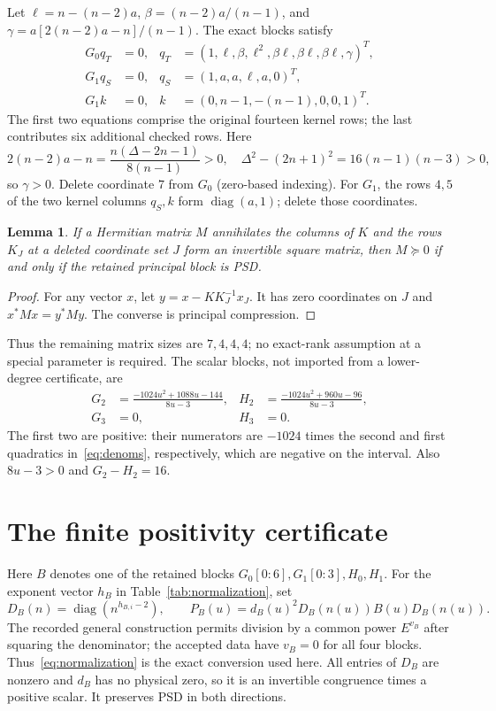 \documentclass[11pt]{article}
\newtheorem{lemma}[theorem]{Lemma}
\DeclareMathOperator{\diag}{diag}
\begin{document}
Let $\ell=n-(n-2)a$, $\beta=(n-2)a/(n-1)$, and
$\gamma=a[2(n-2)a-n]/(n-1)$. The exact blocks satisfy
\begin{align}
 G_0q_T&=0,& q_T&=(1,\ell,\beta,\ell^2,\beta\ell,\beta\ell,\beta\ell,\gamma)^T,
 \label{eq:kernelT}\\
 G_1q_S&=0,& q_S&=(1,a,a,\ell,a,0)^T,\nonumber\\
 G_1k&=0,& k&=(0,n-1,-(n-1),0,0,1)^T.\label{eq:kernelS}
\end{align}
The first two equations comprise the original fourteen kernel rows;
the last contributes six additional checked rows. Here
\[
 2(n-2)a-n=\frac{n(\Delta-2n-1)}{8(n-1)}>0,
 \quad \Delta^2-(2n+1)^2=16(n-1)(n-3)>0,
\]
so $\gamma>0$. Delete coordinate $7$ from $G_0$ (zero-based indexing).
For $G_1$, the rows $4,5$ of the two kernel columns $q_S,k$ form
$\diag(a,1)$; delete those coordinates.

\begin{lemma}\label{lem:delete}
If a Hermitian matrix $M$ annihilates the columns of $K$ and the rows
$K_J$ at a deleted coordinate set $J$ form an invertible square matrix,
then $M\succeq0$ if and only if the retained principal block is PSD.
\end{lemma}
\begin{proof}
For any vector $x$, let $y=x-KK_J^{-1}x_J$. It has zero coordinates
on $J$ and $x^*Mx=y^*My$. The converse is principal compression.
\end{proof}
Thus the remaining matrix sizes are $7,4,4,4$; no exact-rank assumption
at a special parameter is required. The scalar blocks, not imported
from a lower-degree certificate, are
\begin{align}
 G_2&=\frac{-1024u^2+1088u-144}{8u-3},&
 H_2&=\frac{-1024u^2+960u-96}{8u-3},\label{eq:scalars}\\
 G_3&=0,&H_3&=0.\nonumber
\end{align}
The first two are positive: their numerators are $-1024$ times the
second and first quadratics in~\eqref{eq:denoms}, respectively,
which are negative on the interval. Also $8u-3>0$ and $G_2-H_2=16$.

\section{The finite positivity certificate}\label{sec:verification}
Here $B$ denotes one of the retained blocks
$G_0[0{:}6],G_1[0{:}3],H_0,H_1$.
For the exponent vector $h_B$ in Table~\ref{tab:normalization}, set
\begin{equation}\label{eq:normalization}
 D_B(n)=\diag(n^{h_{B,i}-2}),\qquad
 P_B(u)=d_B(u)^2D_B(n(u))B(u)D_B(n(u)).
\end{equation}
The recorded general construction permits division by a common power
$E^{v_B}$ after squaring the denominator; the accepted data have
$v_B=0$ for all four blocks. Thus~\eqref{eq:normalization} is the exact
conversion used here. All entries of $D_B$ are nonzero and $d_B$ has
no physical zero, so it is an invertible congruence times a positive
scalar. It preserves PSD in both directions.
\end{document}
